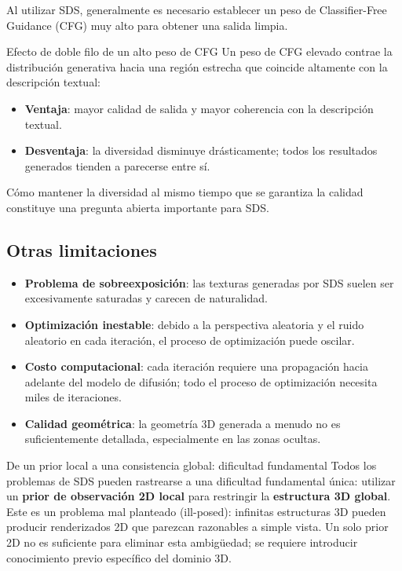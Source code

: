 Al utilizar SDS, generalmente es necesario establecer un peso de Classifier-Free Guidance (CFG) muy alto para obtener una salida limpia.

\begin{knowledgebox}{Efecto de doble filo de un alto peso de CFG}
Un peso de CFG elevado contrae la distribución generativa hacia una región estrecha que coincide altamente con la descripción textual:

\begin{itemize}
    \item \textbf{Ventaja}: mayor calidad de salida y mayor coherencia con la descripción textual.
    \item \textbf{Desventaja}: la diversidad disminuye drásticamente; todos los resultados generados tienden a parecerse entre sí.
\end{itemize}

Cómo mantener la diversidad al mismo tiempo que se garantiza la calidad constituye una pregunta abierta importante para SDS.
\end{knowledgebox}

\subsection{Otras limitaciones}

\begin{itemize}
    \item \textbf{Problema de sobreexposición}: las texturas generadas por SDS suelen ser excesivamente saturadas y carecen de naturalidad.
    \item \textbf{Optimización inestable}: debido a la perspectiva aleatoria y el ruido aleatorio en cada iteración, el proceso de optimización puede oscilar.
    \item \textbf{Costo computacional}: cada iteración requiere una propagación hacia adelante del modelo de difusión; todo el proceso de optimización necesita miles de iteraciones.
    \item \textbf{Calidad geométrica}: la geometría 3D generada a menudo no es suficientemente detallada, especialmente en las zonas ocultas.
\end{itemize}

\begin{warningbox}{De un prior local a una consistencia global: dificultad fundamental}
Todos los problemas de SDS pueden rastrearse a una dificultad fundamental única: utilizar un \textbf{prior de observación 2D local} para restringir la \textbf{estructura 3D global}. Este es un problema mal planteado (ill-posed): infinitas estructuras 3D pueden producir renderizados 2D que parezcan razonables a simple vista. Un solo prior 2D no es suficiente para eliminar esta ambigüedad; se requiere introducir conocimiento previo específico del dominio 3D.
\end{warningbox}


